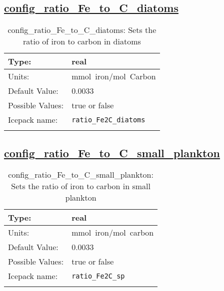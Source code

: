 \subsection[config\_ratio\_Fe\_to\_C\_diatoms]{\hyperref[sec:nm_tab_biogeochemistry]{config\_ratio\_Fe\_to\_C\_diatoms}}
\label{subsec:nm_sec_config_ratio_Fe_to_C_diatoms}
\begin{center}
\begin{longtable}{| p{2.0in} || p{4.0in} |}
    \hline
    Type: & real \\
    \hline
    Units: & \si{mmol.iron/mol.Carbon} \\
    \hline
    Default Value: & 0.0033 \\
    \hline
    Possible Values: & true or false \\
    \hline
    \hline
    Icepack name: & \verb+ratio_Fe2C_diatoms+ \\
    \caption{config\_ratio\_Fe\_to\_C\_diatoms: Sets the ratio of iron to carbon in diatoms}
\end{longtable}
\end{center}
\subsection[config\_ratio\_Fe\_to\_C\_small\_plankton]{\hyperref[sec:nm_tab_biogeochemistry]{config\_ratio\_Fe\_to\_C\_small\_plankton}}
\label{subsec:nm_sec_config_ratio_Fe_to_C_small_plankton}
\begin{center}
\begin{longtable}{| p{2.0in} || p{4.0in} |}
    \hline
    Type: & real \\
    \hline
    Units: & \si{mmol.iron/mol.carbon} \\
    \hline
    Default Value: & 0.0033 \\
    \hline
    Possible Values: & true or false \\
    \hline
    \hline
    Icepack name: & \verb+ratio_Fe2C_sp+ \\
    \caption{config\_ratio\_Fe\_to\_C\_small\_plankton: Sets the ratio of iron to carbon in small plankton}
\end{longtable}
\end{center}
